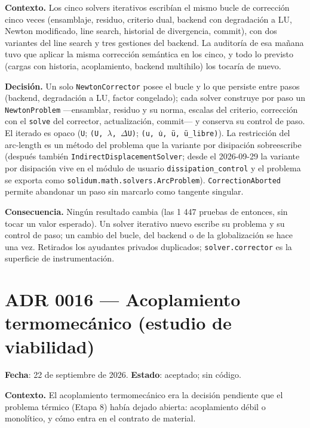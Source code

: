 \documentclass[11pt,oneside]{report}
\begin{document}
\textbf{Contexto.} Los cinco solvers iterativos escribían el mismo bucle de corrección cinco veces (ensamblaje, residuo, criterio dual, backend con degradación a LU, Newton modificado, line search, historial de divergencia, commit), con dos variantes del line search y tres gestiones del backend. La auditoría de esa mañana tuvo que aplicar la misma corrección semántica en los cinco, y todo lo previsto (cargas con historia, acoplamiento, backend multihilo) los tocaría de nuevo.

\textbf{Decisión.} Un solo \texttt{NewtonCorrector} posee el bucle y lo que persiste entre pasos (backend, degradación a LU, factor congelado); cada solver construye por paso un \texttt{NewtonProblem} ---ensamblar, residuo y su norma, escalas del criterio, corrección con el \texttt{solve} del corrector, actualización, commit--- y conserva su control de paso. El iterado es opaco (\texttt{U}; \texttt{(U, \ensuremath{\lambda}, \ensuremath{\Delta}U)}; \texttt{(u, u̇, ü, ü\_\allowbreak{}libre)}). La restricción del arc-length es un método del problema que la variante por disipación sobreescribe (después también \texttt{IndirectDisplacementSolver}; desde el 2026-09-29 la variante por disipación vive en el módulo de usuario \texttt{dissipation\_\allowbreak{}control} y el problema se exporta como \texttt{solidum.\allowbreak{}math.\allowbreak{}solvers.\allowbreak{}ArcProblem}). \texttt{CorrectionAborted} permite abandonar un paso sin marcarlo como tangente singular.

\textbf{Consecuencia.} Ningún resultado cambia (las 1 447 pruebas de entonces, sin tocar un valor esperado). Un solver iterativo nuevo escribe su problema y su control de paso; un cambio del bucle, del backend o de la globalización se hace una vez. Retirados los ayudantes privados duplicados; \texttt{solver.corrector} es la superficie de instrumentación.

\section{ADR 0016 --- Acoplamiento termomecánico (estudio de viabilidad)}
\label{adr:0016}

\textbf{Fecha}: 22 de septiembre de 2026. \textbf{Estado}: aceptado; sin código.

\textbf{Contexto.} El acoplamiento termomecánico era la decisión pendiente que el problema térmico (Etapa 8) había dejado abierta: acoplamiento débil o monolítico, y cómo entra en el contrato de material.
\end{document}
